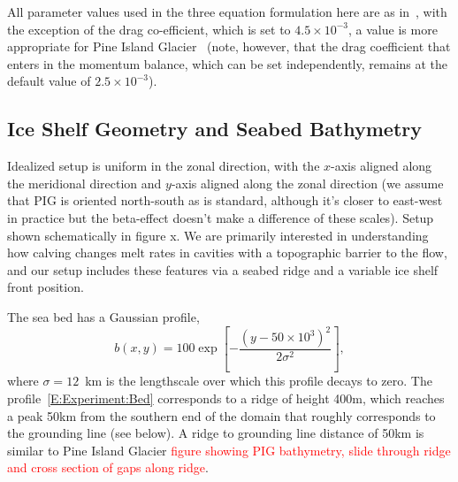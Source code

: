 \documentclass[draft]{agujournal2019}
\newcommand{\red}[1]{\textcolor{red}{#1}}
\begin{document}
All parameter values used in the three equation formulation here are as in~, with the exception of the drag co-efficient, which is set to $4.5\times10^{-3}$, a value is more appropriate for Pine Island Glacier~\cite{Dutrieux2014Science} (note, however, that the drag coefficient that enters in the momentum balance, which can be set independently, remains at the default value of $2.5\times 10^{-3}$).

\subsection{Ice Shelf Geometry and Seabed Bathymetry}\label{S:Experiment:Geometry}
Idealized setup is uniform in the zonal direction, with the $x$-axis aligned along the meridional direction and $y$-axis aligned along the zonal direction (we assume that PIG is oriented north-south as is standard, although it's closer to east-west in practice but the beta-effect doesn't make a difference of these scales). Setup shown schematically in figure x. We are primarily interested in understanding how calving changes melt rates in cavities with a topographic barrier to the flow, and our setup includes these features via a seabed ridge and a variable ice shelf front position. 

The sea bed has a Gaussian profile,
\begin{equation}\label{E:Experiment:Bed}
    b(x,y) = 100 \exp\left[-\frac{\left(y - 50\times 10^3\right)^2}{2\sigma^2}\right],
\end{equation}
where $\sigma = 12$~km is the lengthscale over which this profile decays to zero. The profile~\ref{E:Experiment:Bed} corresponds to a ridge of height 400m, which reaches a peak 50km from the southern end of the domain that roughly corresponds to the grounding line (see below). A ridge to grounding line distance of 50km is similar to Pine Island Glacier \red{figure showing PIG bathymetry, slide through ridge and cross section of gaps along ridge}.
\end{document}
